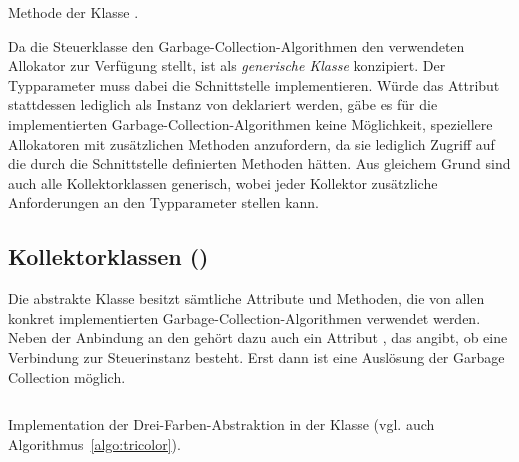 \begin{listing}[h]
	\inputminted[]{java}{code/Controller-collect.java}
	\caption[Methode  der Klasse ]{Methode  der Klasse .}
	\label{java:controller-collect}
\end{listing}

Da die Steuerklasse den Garbage-Collection-Algorithmen den verwendeten Allokator zur Verfügung stellt, ist  als \textit{generische Klasse} konzipiert.
Der Typparameter  muss dabei die Schnittstelle  implementieren.
Würde das Attribut  stattdessen lediglich als Instanz von  deklariert werden, gäbe es für die implementierten Garbage-Collection-Algorithmen keine Möglichkeit, speziellere Allokatoren mit zusätzlichen Methoden anzufordern, da sie lediglich Zugriff auf die durch die Schnittstelle definierten Methoden hätten.
Aus gleichem Grund sind auch alle Kollektorklassen generisch, wobei jeder Kollektor zusätzliche Anforderungen an den Typparameter stellen kann.

\subsection{Kollektorklassen ()}
\label{sub:impl-gc}
Die abstrakte Klasse  besitzt sämtliche Attribute und Methoden, die von allen konkret implementierten Garbage-Collection-Algorithmen verwendet werden.
Neben der Anbindung an den  gehört dazu auch ein Attribut , das angibt, ob eine Verbindung zur Steuerinstanz besteht.
Erst dann ist eine Auslösung der Garbage Collection möglich.

\begin{listing}[t!]
	\inputminted[]{java}{code/MarkSweep-core.java}
	\caption[Implementation der Drei-Farben-Abstraktion]{Implementation der Drei-Farben-Abstraktion in der Klasse  (vgl. auch Algorithmus~\ref{algo:tricolor}).}
	\label{java:tricolor-core}
\end{listing}

